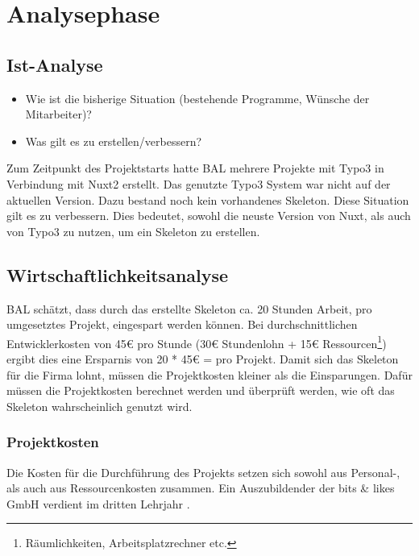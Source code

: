 \section{Analysephase} 
\label{sec:Analysephase}


\subsection{Ist-Analyse} 
\label{sec:IstAnalyse}
\begin{itemize}
	\item Wie ist die bisherige Situation (\zB bestehende Programme, Wünsche der Mitarbeiter)?
	\item Was gilt es zu erstellen/verbessern?
\end{itemize}

Zum Zeitpunkt des Projektstarts hatte \acs{BAL} mehrere Projekte mit Typo3 in Verbindung mit Nuxt2 erstellt. Das genutzte Typo3 System war nicht auf der aktuellen Version. Dazu bestand noch kein vorhandenes Skeleton. Diese Situation gilt es zu verbessern. Dies bedeutet, sowohl die neuste Version von Nuxt, als auch von Typo3 zu nutzen, um ein Skeleton zu erstellen.


\subsection{Wirtschaftlichkeitsanalyse}
\label{sec:Wirtschaftlichkeitsanalyse}

\acs{BAL} schätzt, dass durch das erstellte Skeleton ca. 20 Stunden Arbeit, pro umgesetztes Projekt, eingespart werden können. Bei durchschnittlichen Entwicklerkosten von 45€ pro Stunde (30€ Stundenlohn + 15€ Ressourcen\footnote{Räumlichkeiten, Arbeitsplatzrechner etc.}) ergibt dies eine Ersparnis von 20 * 45€ =  pro Projekt. Damit sich das Skeleton für die Firma lohnt, müssen die Projektkosten kleiner als die Einsparungen. Dafür müssen die Projektkosten berechnet werden und überprüft werden, wie oft das Skeleton wahrscheinlich genutzt wird.


\subsubsection{Projektkosten}
\label{sec:Projektkosten}

Die Kosten für die Durchführung des Projekts setzen sich sowohl aus Personal-, als auch aus Ressourcenkosten zusammen.
Ein Auszubildender der bits \& likes GmbH verdient im dritten Lehrjahr .

